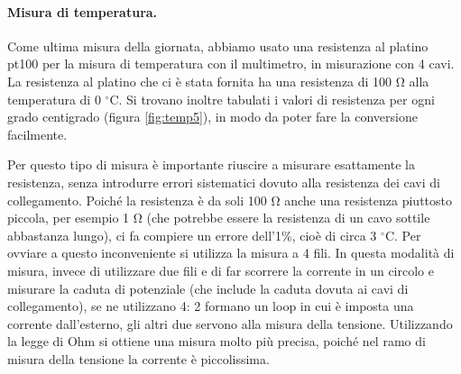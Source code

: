 %
%
%
%
%

\paragraph{Misura di temperatura.}

Come ultima misura della giornata, abbiamo usato una resistenza al platino pt100 per la misura di temperatura con il multimetro,
in misurazione con 4 cavi. La resistenza al platino che ci è stata fornita ha una resistenza di 100 \si{\ohm} alla temperatura
di 0 $^\circ$C. Si trovano inoltre tabulati i valori di resistenza per ogni grado centigrado (figura \ref{fig:temp5}),
in modo da poter fare la conversione facilmente.

Per questo tipo di misura è importante riuscire a misurare esattamente la resistenza, senza introdurre errori sistematici
dovuto alla resistenza dei cavi di collegamento. Poiché la resistenza è da soli 100 \si{\ohm} anche una resistenza piuttosto
piccola, per esempio 1 \si{\ohm} (che potrebbe essere la resistenza di un cavo sottile abbastanza lungo), ci fa compiere un errore
dell'1\%, cioè di circa 3 $^\circ$C. Per ovviare a questo inconveniente si utilizza la misura a 4 fili. In questa modalità di misura,
invece di utilizzare due fili e di far scorrere la corrente in un circolo e misurare la caduta di potenziale (che include la caduta dovuta
ai cavi di collegamento), se ne utilizzano 4: 2 formano un loop in cui è imposta una corrente dall'esterno, gli altri due servono
alla misura della tensione. Utilizzando la legge di Ohm si ottiene una misura molto più precisa, poiché
nel ramo di misura della tensione la corrente è piccolissima.

